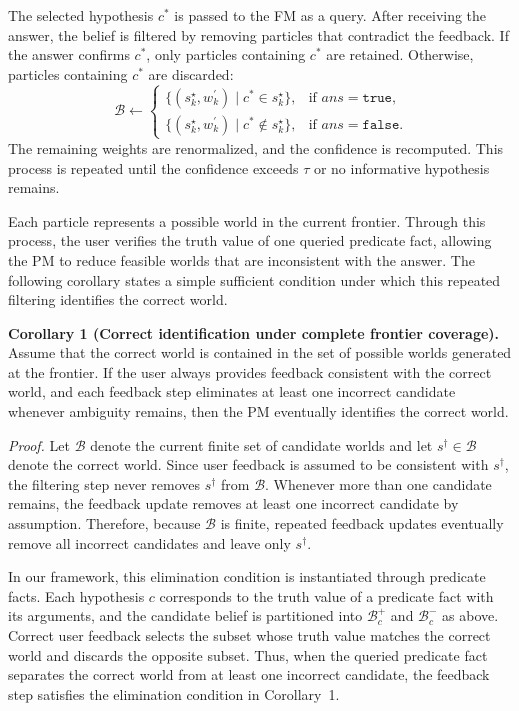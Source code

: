 The selected hypothesis $c^{*}$ is passed to the FM as a query. After receiving the answer, the belief is filtered by removing particles that contradict the feedback. If the answer confirms $c^{*}$, only particles containing $c^{*}$ are retained. Otherwise, particles containing $c^{*}$ are discarded:
\begin{equation}~\label{eq:filter}
\mathcal{B} \leftarrow
\begin{cases}
\{(s_k^{\star}, w_k^\prime) \mid c^{*} \in s_k^{\star}\}, & \text{if } ans = \texttt{true}, \\
\{(s_k^{\star}, w_k^\prime) \mid c^{*} \notin s_k^{\star}\}, & \text{if } ans = \texttt{false}.
\end{cases}
\end{equation}
The remaining weights are renormalized, and the confidence is recomputed. This process is repeated until the confidence exceeds $\tau$ or no informative hypothesis remains.

Each particle represents a possible world in the current frontier. Through this process, the user verifies the truth value of one queried predicate fact, allowing the PM to reduce feasible worlds that are inconsistent with the answer. The following corollary states a simple sufficient condition under which this repeated filtering identifies the correct world.

\noindent\textbf{Corollary 1 (Correct identification under complete frontier coverage).}
Assume that the correct world is contained in the set of possible worlds generated at the frontier. If the user always provides feedback consistent with the correct world, and each feedback step eliminates at least one incorrect candidate whenever ambiguity remains, then the PM eventually identifies the correct world.

\noindent\textit{Proof.}
Let $\mathcal{B}$ denote the current finite set of candidate worlds and let $s^{\dagger} \in \mathcal{B}$ denote the correct world. Since user feedback is assumed to be consistent with $s^{\dagger}$, the filtering step never removes $s^{\dagger}$ from $\mathcal{B}$. Whenever more than one candidate remains, the feedback update removes at least one incorrect candidate by assumption. Therefore, because $\mathcal{B}$ is finite, repeated feedback updates eventually remove all incorrect candidates and leave only $s^{\dagger}$. \qedm

In our framework, this elimination condition is instantiated through predicate facts. Each hypothesis $c$ corresponds to the truth value of a predicate fact with its arguments, and the candidate belief is partitioned into $\mathcal{B}^{+}_{c}$ and $\mathcal{B}^{-}_{c}$ as above. Correct user feedback selects the subset whose truth value matches the correct world and discards the opposite subset. Thus, when the queried predicate fact separates the correct world from at least one incorrect candidate, the feedback step satisfies the elimination condition in Corollary~1.





